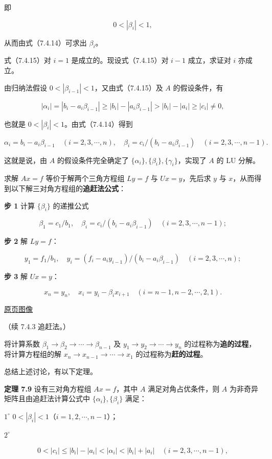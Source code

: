 \documentclass[
  10pt,
  fontset=fandol]{ctexart}
\begin{document}
即

\[
0<|\beta_i|<1,
\]

从而由式（7.4.14）可求出 \(\beta_i\)。

式（7.4.15）对 \(i=1\) 是成立的。现设式（7.4.15）对 \(i-1\) 成立，求证对 \(i\) 亦成立。

由归纳法假设 \(0<|\beta_{i-1}|<1\)，又由式（7.4.15）及 \(A\) 的假设条件，有

\[
|\alpha_i|=|b_i-a_i\beta_{i-1}|\geqslant|b_i|-|a_i\beta_{i-1}|>|b_i|-|a_i|\geqslant|c_i|\neq0,
\]

也就是 \(0<|\beta_i|<1\)。由式（7.4.14）得到

\[
\alpha_i=b_i-a_i\beta_{i-1}\quad(i=2,3,\cdots,n),\quad
\beta_i=c_i/(b_i-a_i\beta_{i-1})\quad(i=2,3,\cdots,n-1).
\]

这就是说，由 \(A\) 的假设条件完全确定了 \(\{\alpha_i\},\{\beta_i\},\{\gamma_i\}\)，实现了 \(A\) 的 LU 分解。

求解 \(Ax=f\) 等价于解两个三角方程组 \(Ly=f\) 与 \(Ux=y\)，先后求 \(y\) 与 \(x\)，从而得到以下解三对角方程组的\textbf{追赶法公式}：

\textbf{步 1} 计算 \(\{\beta_i\}\) 的递推公式

\[
\beta_1=c_1/b_1,\quad\beta_i=c_i/(b_i-a_i\beta_{i-1})\quad(i=2,3,\cdots,n-1);
\]

\textbf{步 2} 解 \(Ly=f\)：

\[
y_1=f_1/b_1,\quad y_i=(f_i-a_iy_{i-1})/(b_i-a_i\beta_{i-1})\quad(i=2,3,\cdots,n);
\]

\textbf{步 3} 解 \(Ux=y\)：

\[
x_n=y_n,\quad x_i=y_i-\beta_ix_{i+1}\quad(i=n-1,n-2,\cdots,2,1).
\]

\href{../../source-images/pdf-199.jpeg}{原页图像}

（续 7.4.3 追赶法。）

将计算系数 \(\beta_1\to\beta_2\to\cdots\to\beta_{n-1}\) 及 \(y_1\to y_2\to\cdots\to y_n\) 的过程称为\textbf{追的过程}，将计算方程组的解 \(x_n\to x_{n-1}\to\cdots\to x_1\) 的过程称为\textbf{赶的过程}。

总结上述讨论，有以下定理。

\textbf{定理 7.9} 设有三对角方程组 \(Ax=f\)，其中 \(A\) 满足对角占优条件，则 \(A\) 为非奇异矩阵且由追赶法计算公式中 \(\{\alpha_i\},\{\beta_i\}\) 满足：

\(1^\circ\) \(0<|\beta_i|<1\)（\(i=1,2,\cdots,n-1\)）；

\(2^\circ\)

\[
0<|c_i|\leqslant|b_i|-|a_i|<|\alpha_i|<|b_i|+|a_i|\quad(i=2,3,\cdots,n-1),
\]
\end{document}

